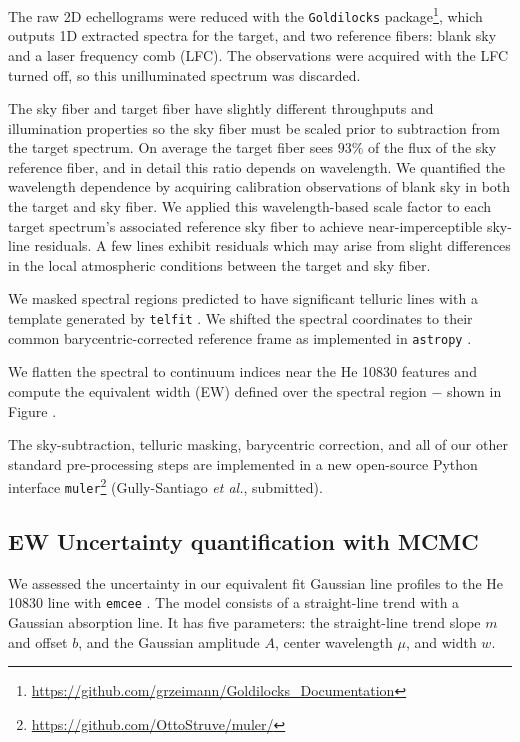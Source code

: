 \documentclass[twocolumn]{aastex631}
\begin{document}
The raw 2D echellograms were reduced with the \texttt{Goldilocks} package\footnote{\url{https://github.com/grzeimann/Goldilocks_Documentation}}, which outputs 1D extracted spectra for the target, and two reference fibers: blank sky and a laser frequency comb (LFC).  The observations were acquired with the LFC turned off, so this unilluminated spectrum was discarded.

The sky fiber and target fiber have slightly different throughputs and illumination properties so the sky fiber must be scaled prior to subtraction from the target spectrum.  On average the target fiber sees $93\%$ of the flux of the sky reference fiber, and in detail this ratio depends on wavelength.  We quantified the wavelength dependence by acquiring calibration observations of blank sky in both the target and sky fiber.  We applied this wavelength-based scale factor to each target spectrum's associated reference sky fiber to achieve near-imperceptible sky-line residuals.  A few lines exhibit residuals which may arise from slight differences in the local atmospheric conditions between the target and sky fiber.

We masked spectral regions predicted to have significant telluric lines with a template generated by \texttt{telfit} \citep{2014AJ....148...53G}.  We shifted the spectral coordinates to their common barycentric-corrected reference frame \citep{2014PASP..126..838W} as implemented in \texttt{astropy} \citep{2013A&A...558A..33A,2018AJ....156..123A}.

We flatten the spectral to continuum indices near the He 10830 features and compute the equivalent width (EW) defined over the spectral region $-$ shown in Figure .

The sky-subtraction, telluric masking, barycentric correction, and all of our other standard pre-processing steps are implemented in a new open-source Python interface \texttt{muler}\footnote{\url{https://github.com/OttoStruve/muler/}} (Gully-Santiago \emph{et al.}, submitted).


\subsection{EW Uncertainty quantification with MCMC}
We assessed the uncertainty in our equivalent fit Gaussian line profiles to the He 10830 line with \texttt{emcee} \citep{foreman13}. The model consists of a straight-line trend with a Gaussian absorption line.  It has five parameters: the straight-line trend slope $m$ and offset $b$, and the Gaussian amplitude $A$, center wavelength $\mu$, and width $w$.
\end{document}
